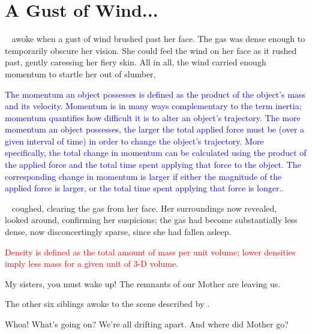 \documentclass[main.tex]{subfiles}
\begin{document}

\chapter{A Gust of Wind...}

\par \nar \rmsterope~ awoke when a gust of wind brushed past her face.  The gas was dense enough to temporarily obscure her vision.  She could feel the wind on her face as it rushed past, gently caressing her fiery skin.  All in all, the wind carried enough momentum to startle her out of slumber,

\par \textcolor{blue} {\nar The momentum an object possesses is defined as the product of the object's mass and its velocity.  Momentum is in many ways complementary to the term inertia; momentum quantifies how difficult it is to alter an object's trajectory.  The more momentum an object possesses, the larger the total applied force must be (over a given interval of time) in order to change the object's trajectory.  More specifically, the total change in momentum can be calculated using the product of the applied force and the total time spent applying that force to the object.  The corresponding change in momentum is larger if either the magnitude of the applied force is larger, or the total time spent applying that force is longer.}.  

\par \nar \rmsterope~ coughed, clearing the gas from her face.  Her surroundings now revealed, \rmsterope~ looked around, confirming her suspicions; the gas had become substantially less dense, now disconcertingly sparse, since she had fallen asleep. 

\par \textcolor{red} {\nar Density is defined as the total amount of mass per unit volume; lower densities imply less mass for a given unit of 3-D volume.}  

\par \Sterope My sisters, you must wake up!  The remnants of our Mother are leaving us.

\par \nar The other six siblings awoke to the scene described by \rmsterope.  

\par \Electra Whoa!  What's going on?  We're all drifting apart.  And where did Mother go?
\end{document}
